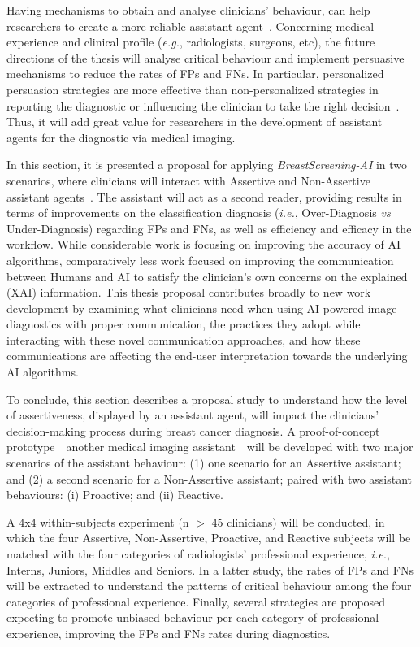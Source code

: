 Having mechanisms to obtain and analyse clinicians' behaviour, can help researchers to create a more reliable assistant agent~\cite{Miao2019}.
Concerning medical experience and clinical profile ({\it e.g.}, radiologists, surgeons, etc), the future directions of the thesis will analyse critical behaviour and implement persuasive mechanisms to reduce the rates of \acp{FP} and \acp{FN}.
In particular, personalized persuasion strategies are more effective than non-personalized strategies in reporting the diagnostic or influencing the clinician to take the right decision~\cite{sonntag2016persuasive}.
Thus, it will add great value for researchers in the development of assistant agents for the diagnostic via medical imaging.

In this section, it is presented a proposal for applying {\it BreastScreening-AI} in two scenarios, where clinicians will interact with Assertive and Non-Assertive assistant agents~\cite{pacheco2019alignment, 10.1145/3311350.3347162}.
The assistant will act as a second reader, providing results in terms of improvements on the classification diagnosis ({\it i.e.}, Over-Diagnosis {\it vs} Under-Diagnosis) regarding \acp{FP} and \acp{FN}, as well as efficiency and efficacy in the workflow.
While considerable work is focusing on improving the accuracy of \ac{AI} algorithms, comparatively less work focused on improving the communication between Humans and \ac{AI} to satisfy the clinician's own concerns on the explained (\ac{XAI}) information.
This thesis proposal contributes broadly to new work development by examining what clinicians need when using \ac{AI}-powered image diagnostics with proper communication, the practices they adopt while interacting with these novel communication approaches, and how these communications are affecting the end-user interpretation towards the underlying \ac{AI} algorithms.

To conclude, this section describes a proposal study to understand how the level of assertiveness, displayed by an assistant agent, will impact the clinicians' decision-making process during breast cancer diagnosis.
A proof-of-concept prototype~\textendash~another medical imaging assistant~\textendash~will be developed with two major scenarios of the assistant behaviour:
(1) one scenario for an Assertive assistant; and
(2) a second scenario for a Non-Assertive assistant;
paired with two assistant behaviours:
(i) Proactive; and
(ii) Reactive.

A $4$x$4$ within-subjects experiment (n $>$ 45 clinicians) will be conducted, in which the four Assertive, Non-Assertive, Proactive, and Reactive subjects will be matched with the four categories of radiologists' professional experience, {\it i.e.}, Interns, Juniors, Middles and Seniors.
In a latter study, the rates of \acp{FP} and \acp{FN} will be extracted to understand the patterns of critical behaviour among the four categories of professional experience.
Finally, several strategies are proposed expecting to promote unbiased behaviour per each category of professional experience, improving the \acp{FP} and \acp{FN} rates during diagnostics.

